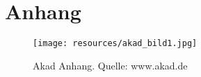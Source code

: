 \chapter{Anhang}

\begin{figure}[H]
\begin{center}
\texttt{[image: resources/akad\_bild1.jpg]}
\caption[Akad Anhang]{Akad Anhang. Quelle: www.akad.de}
\end{center}
\end{figure}

%